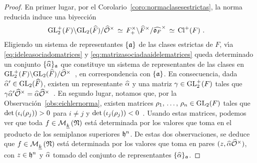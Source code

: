 \begin{proof}
	En primer lugar, por el Corolario~\ref{coro:normaclasesestrictas}, la
	norma reducida induce una biyecci\'{o}n
	\begin{align*}
		\GLtp_{2}(F)\backslash\GL_{2}(\Adfin{F})/\Idfin{\cal{O}}
			& \,\simeq\,
			F_{+}^{\times}\backslash\Idfin{F}/\Idfin{\oka{F}}
			\,\simeq\,\pClass{F}
		\text{ .}
	\end{align*}
	Eligiendo un sistema de representantes $\{\frak{a}\}$ de las clases
	estrictas de $F$, v\'{\i}a \eqref{eq:ideleasociadomatrices} y
	\eqref{eq:matrizasociadaaidelematrices} queda determinado un conjunto
	$\{\hhat{\alpha}\}_{\frak{a}}$ que constituye un sistema de
	representantes de las clases en
	\begin{math}
		\GLtp_{2}(F)\backslash\GL_{2}(\Adfin{F})/\Idfin{\cal{O}}
	\end{math}~,
	en correspondencia con $\{\frak{a}\}$.
	En consecuencia, dada $\hhat{\alpha}'\in\GL_{2}(\Adfin{F})$, existen un
	representante $\hhat{\alpha}$ y una matriz $\gamma\in\GLtp_{2}(F)$
	tales que
	\begin{math}
		\gamma\hhat{\alpha}'\Idfin{\cal{O}}=
			\hhat{\alpha}\Idfin{\cal{O}}
	\end{math}~.
	En segundo lugar, notamos que, por la
	Observaci\'{o}n~\ref{obs:eichlernorma}, existen matrices
	$\lista{\rho}{n}\in \GL_{2}(F)$ tales que
	\begin{math}
		\det(\inc[i](\rho_{j}))>0
	\end{math} para $i\not=j$ y
	\begin{math}
		\det(\inc[j](\rho_{j}))<0
	\end{math}~. Usando estas matrices, podemos ver que toda
	$f\in\modularH{k}{\frak{N}}$ est\'{a} determinada por los valores que
	toma en el producto de los semiplanos superiores $\hP^{n}$.
	De estas dos observaciones, se deduce que $f\in\modularH{k}{\frak{N}}$
	est\'{a} determinada por los valores que toma en pares
	$(z,\hhat{\alpha}\Idfin{\cal{O}})$, con $z\in\hP^{n}$ y $\hhat{\alpha}$
	tomado del conjunto de representantes $\{\hhat{\alpha}\}_{\frak{a}}$.


\end{proof}
